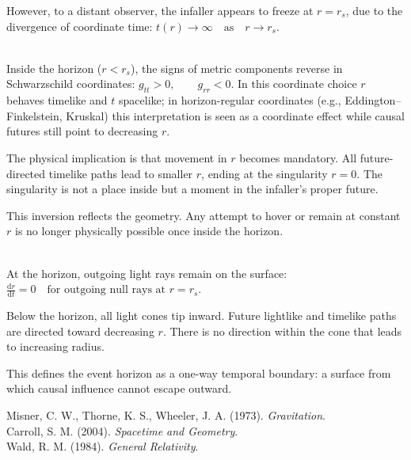 \begin{technical}
However, to a distant observer, the infaller appears to freeze at \(r = r_s\), due to the divergence of coordinate time: $
t(r) \to \infty \quad \text{as} \quad r \to r_s$.

\vspace{0.3em}
\\[0.5em]
Inside the horizon (\(r < r_s\)), the signs of metric components reverse in Schwarzschild coordinates: $g_{tt} > 0, \qquad g_{rr} < 0$.
In this coordinate choice \(r\) behaves timelike and \(t\) spacelike; in horizon-regular coordinates (e.g., Eddington–Finkelstein, Kruskal) this interpretation is seen as a coordinate effect while causal futures still point to decreasing \(r\).

The physical implication is that movement in \(r\) becomes mandatory. All future-directed timelike paths lead to smaller \(r\), ending at the singularity \(r = 0\). The singularity is not \QSOpen{}a place inside\QSClose{} but a moment in the infaller’s proper future.

This inversion  reflects the geometry. Any attempt to \QSOpen{}hover\QSClose{} or remain at constant \(r\) is no longer physically possible once inside the horizon.

\vspace{0.3em}
\\[0.5em]
At the horizon, outgoing light rays remain on the surface: $\frac{\mathrm{d}r}{\mathrm{d}t} = 0 \quad \text{for outgoing null rays at } r = r_s$.

Below the horizon, all light cones tip inward. Future lightlike and timelike paths are directed toward decreasing \(r\). There is no direction within the cone that leads to increasing radius.

This defines the event horizon as a one-way temporal boundary: a surface from which causal influence cannot escape outward.

\techref
{\footnotesize
Misner, C. W., Thorne, K. S., Wheeler, J. A. (1973). \textit{Gravitation}.\\
Carroll, S. M. (2004). \textit{Spacetime and Geometry}.\\
Wald, R. M. (1984). \textit{General Relativity}.
}
\end{technical}
